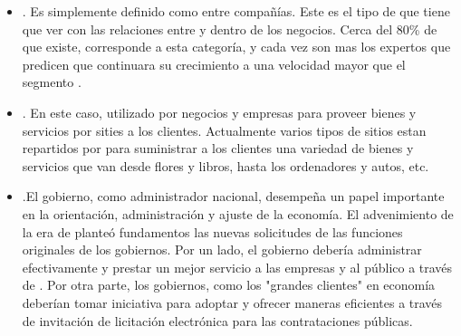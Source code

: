 \begin{itemize}
	\item \textbf{\btob}. Es simplemente definido como \ecommerce entre compañías. Este es el tipo de \ecommerce que tiene que ver con las relaciones entre y dentro de los negocios. Cerca del 80\% de \ecommerce que existe, corresponde a esta categoría, y cada vez son mas los expertos que predicen que \btob \ecommerce continuara su crecimiento a una velocidad mayor que el segmento \btoc.


	\item \textbf{\btoc}. En este caso, \internet utilizado por negocios y empresas para proveer bienes y servicios por sities \web a los clientes. Actualmente varios tipos de sitios \web \btoc estan repartidos por \internet para suministrar a los clientes una variedad de bienes y servicios que van desde flores y libros, hasta los ordenadores y autos, etc.

	\item \textbf{\btog}.El gobierno, como administrador nacional, desempeña un papel importante en la orientación, administración y ajuste de la economía. El advenimiento de la era de \ecommerce planteó fundamentos \ecommerce las nuevas solicitudes de las funciones originales de los gobiernos. Por un lado, el gobierno debería  administrar \emarket efectivamente y prestar un mejor servicio a las empresas y al público a través de \egoverment. Por otra parte, los gobiernos, como los "grandes clientes" en economía deberían tomar iniciativa para adoptar \ecommerce y ofrecer maneras eficientes a través de invitación de licitación electrónica para las contrataciones públicas.



\end{itemize}
